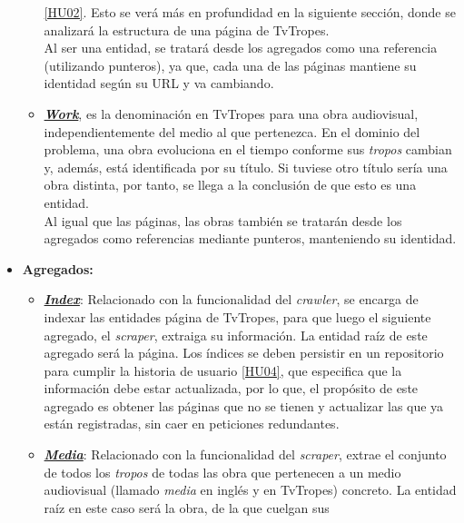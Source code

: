 \begin{itemize}
\begin{itemize}
    \href{https://github.com/jlgallego99/TropesToGo/issues/7}{[HU02]}. Esto se
    verá más en profundidad en la siguiente sección, donde se analizará la
    estructura de una página de TvTropes.\\
    Al ser una entidad, se tratará desde los agregados como una referencia
    (utilizando punteros), ya que, cada una de las páginas mantiene su identidad
    según su URL y va cambiando.
    \item
    \textbf{\href{https://github.com/jlgallego99/TropesToGo/blob/master/tropestogo/work.go}{\textit{Work}}},
    es la denominación en TvTropes para una obra audiovisual, independientemente
    del medio al que pertenezca. En el dominio del problema, una obra evoluciona
    en el tiempo conforme sus \textit{tropos} cambian y, además, está
    identificada por su título. Si tuviese otro título sería una obra distinta,
    por tanto, se llega a la conclusión de que esto es una entidad.\\
    Al igual que las páginas, las obras también se tratarán desde los agregados
    como referencias mediante punteros, manteniendo su identidad.
  \end{itemize}
  \item \textbf{Agregados:}
  \begin{itemize}
    \item
    \textbf{\href{https://github.com/jlgallego99/TropesToGo/blob/master/tropestogo/index/index.go}{\textit{Index}}}:
    Relacionado con la funcionalidad del \textit{crawler}, se encarga de indexar
    las entidades página de TvTropes, para que luego el siguiente agregado, el
    \textit{scraper}, extraiga su información. La entidad raíz de este agregado
    será la página. Los índices se deben persistir en un repositorio para
    cumplir la historia de usuario
    \href{https://github.com/jlgallego99/TropesToGo/issues/9}{[HU04]}, que
    especifica que la información debe estar actualizada, por lo que, el
    propósito de este agregado es obtener las páginas que no se tienen y
    actualizar las que ya están registradas, sin caer en peticiones redundantes.
    \item
    \textbf{\href{https://github.com/jlgallego99/TropesToGo/blob/master/tropestogo/media/media.go}{\textit{Media}}}:
    Relacionado con la funcionalidad del \textit{scraper}, extrae el conjunto de
    todos los \textit{tropos} de todas las obra que pertenecen a un medio
    audiovisual (llamado \textit{media} en inglés y en TvTropes) concreto. La
    entidad raíz en este caso será la obra, de la que cuelgan sus

\end{itemize}
\end{itemize}
